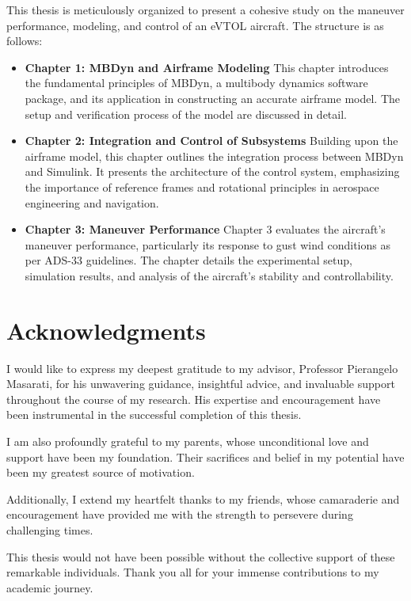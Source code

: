 \documentclass{Configuration_Files/PoliMi3i_thesis}
\begin{document}
This thesis is meticulously organized to present a cohesive study on the maneuver performance, modeling, and control of an eVTOL aircraft. The structure is as follows:

\begin{itemize}
    \item \textbf{Chapter 1: MBDyn and Airframe Modeling}
    This chapter introduces the fundamental principles of MBDyn, a multibody dynamics software package, and its application in constructing an accurate airframe model. The setup and verification process of the model are discussed in detail.
    
    \item \textbf{Chapter 2: Integration and Control of Subsystems}
    Building upon the airframe model, this chapter outlines the integration process between MBDyn and Simulink. It presents the architecture of the control system, emphasizing the importance of reference frames and rotational principles in aerospace engineering and navigation.
    
    \item \textbf{Chapter 3: Maneuver Performance}
    Chapter 3 evaluates the aircraft's maneuver performance, particularly its response to gust wind conditions as per ADS-33 guidelines. The chapter details the experimental setup, simulation results, and analysis of the aircraft's stability and controllability.
\end{itemize}











\chapter*{Acknowledgments}

I would like to express my deepest gratitude to my advisor, Professor Pierangelo Masarati, for his unwavering guidance, insightful advice, and invaluable support throughout the course of my research. His expertise and encouragement have been instrumental in the successful completion of this thesis.

I am also profoundly grateful to my parents, whose unconditional love and support have been my foundation. Their sacrifices and belief in my potential have been my greatest source of motivation.

Additionally, I extend my heartfelt thanks to my friends, whose camaraderie and encouragement have provided me with the strength to persevere during challenging times.

This thesis would not have been possible without the collective support of these remarkable individuals. Thank you all for your immense contributions to my academic journey.

\cleardoublepage
\end{document}
